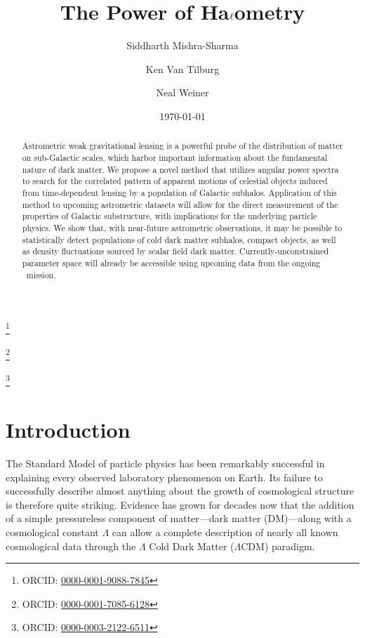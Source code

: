 \documentclass[prd,aps,twocolumn,nofootinbib,superscriptaddress,preprintnumbers,balancelastpage,longbibliography,floatfix]{revtex4-1}
\begin{document}
\title{The Power of Ha$\boldmath\ell$ometry}
\author{Siddharth Mishra-Sharma}
\thanks{ORCID: \href{https://orcid.org/0000-0001-9088-7845}{0000-0001-9088-7845}}
\author{Ken Van Tilburg}
\thanks{ORCID: \href{https://orcid.org/0000-0001-7085-6128}{0000-0001-7085-6128}}
\author{Neal Weiner}
\thanks{ORCID: \href{https://orcid.org/0000-0003-2122-6511}{0000-0003-2122-6511}}

\date{\today}

\begin{abstract}
Astrometric weak gravitational lensing is a powerful probe of the distribution of matter on sub-Galactic scales, which harbor important information about the fundamental nature of dark matter. We propose a novel method that utilizes angular power spectra to search for the correlated pattern of apparent motions of celestial objects induced from time-dependent lensing by a population of Galactic subhalos. Application of this method to upcoming astrometric datasets will allow for the direct measurement of the properties of Galactic substructure, with implications for the underlying particle physics. We show that, with near-future astrometric observations, it may be possible to statistically detect populations of cold dark matter subhalos, compact objects, as well as density fluctuations sourced by scalar field dark matter. Currently-unconstrained parameter space will already be accessible using upcoming data from the ongoing {\Gaia}~mission. \githubmaster
\end{abstract}

\maketitle

\tableofcontents

\section{Introduction}
The Standard Model of particle physics has been remarkably successful in explaining every observed laboratory phenomenon on Earth. Its failure to successfully describe almost anything about the growth of cosmological structure is therefore quite striking. Evidence has grown for decades now that the addition of a simple pressureless component of matter---dark matter (DM)---along with a cosmological constant $\Lambda$ can allow a complete description of nearly all known cosmological data through the $\Lambda$ Cold Dark Matter ($\Lambda$CDM) paradigm. 
\end{document}
